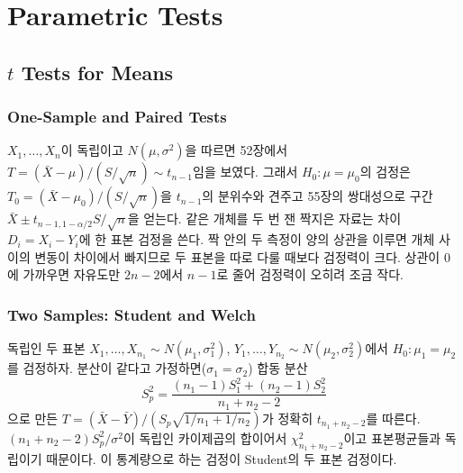 \chapter{Parametric Tests}
\label{ch:parametric-tests}


\section{$t$ Tests for Means}
\label{sec:t-tests}

\subsection{One-Sample and Paired Tests}

$X_1,\dots,X_n$이 독립이고 $N(\mu,\sigma^2)$을 따르면 52장에서 $T=(\bar X-\mu)/(S/\sqrt n)\sim t_{n-1}$임을 보였다. 그래서 $H_0:\mu=\mu_0$의 검정은 $T_0=(\bar X-\mu_0)/(S/\sqrt n)$을 $t_{n-1}$의 분위수와 견주고 55장의 쌍대성으로 구간 $\bar X\pm t_{n-1,1-\alpha/2}S/\sqrt n$을 얻는다. 같은 개체를 두 번 잰 짝지은 자료는 차이 $D_i=X_i-Y_i$에 한 표본 검정을 쓴다. 짝 안의 두 측정이 양의 상관을 이루면 개체 사이의 변동이 차이에서 빠지므로 두 표본을 따로 다룰 때보다 검정력이 크다. 상관이 $0$에 가까우면 자유도만 $2n-2$에서 $n-1$로 줄어 검정력이 오히려 조금 작다.

\subsection{Two Samples: Student and Welch}

독립인 두 표본 $X_1,\dots,X_{n_1}\sim N(\mu_1,\sigma_1^2)$, $Y_1,\dots,Y_{n_2}\sim N(\mu_2,\sigma_2^2)$에서 $H_0:\mu_1=\mu_2$를 검정하자. 분산이 같다고 가정하면($\sigma_1=\sigma_2$) 합동 분산
\[
S_p^2=\frac{(n_1-1)S_1^2+(n_2-1)S_2^2}{n_1+n_2-2}
\]
으로 만든 $T=(\bar X-\bar Y)/(S_p\sqrt{1/n_1+1/n_2})$가 정확히 $t_{n_1+n_2-2}$를 따른다. $(n_1+n_2-2)S_p^2/\sigma^2$이 독립인 카이제곱의 합이어서 $\chi^2_{n_1+n_2-2}$이고 표본평균들과 독립이기 때문이다. 이 통계량으로 하는 검정이 Student의 두 표본 검정이다.


